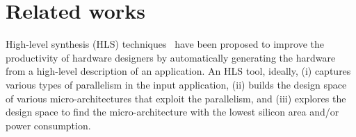 
\section{Related works}

High-level synthesis (HLS) techniques~\cite{jcong_hls,canis_2011_legup, vivado} have been proposed to improve the productivity of hardware designers by automatically generating the hardware from a high-level description of an application. An HLS tool, ideally, (i) captures various types of parallelism in the input application, (ii) builds the design space of various micro-architectures that exploit the parallelism, and (iii) explores the design space to find the micro-architecture with the lowest silicon area and/or power consumption.